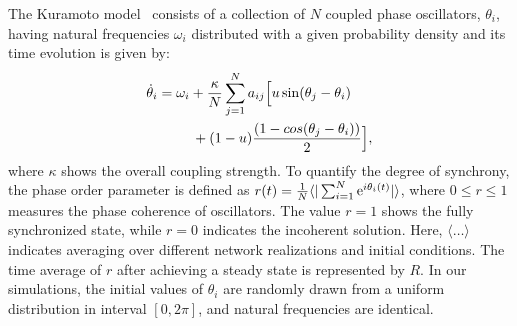 \documentclass[a0paper,portrait]{baposter}
\begin{document}
\begin{poster}


{
The Kuramoto model~\cite{kuramoto2003chemical} consists of a collection of $N$ coupled phase oscillators, $\theta_i$, having natural frequencies $\omega_i$  distributed
with a given probability density and its time evolution is given by:
\begin{align*}
&\dot{\theta}_i=\omega_i+\frac{\kappa}{N} \sum_{j=1}^{N} a_{ij} \Big[ u\sin(\theta_j-\theta_i)\\
	&\hspace{1.15cm}+(1-u)\frac{(1-cos(\theta_j-\theta_i))}{2} \Big],
\end{align*}
where $\kappa$ shows the overall coupling strength. 
To quantify the degree of synchrony, the phase order parameter is defined as $r(t)= {1\over N} {\langle | \sum_{i=1}^{N} \mathrm{e}^{i\theta_{i}(t)}| \rangle}$,  where $0\leq r\leq{1}$ measures the phase coherence of oscillators. The value $r=1$ shows the fully synchronized state, while $r=0$ indicates the incoherent solution. Here, $\langle\dots\rangle$ indicates averaging over different network realizations and initial conditions. The time average of $r$ after achieving a steady state is represented  by $R$. In our simulations, the initial values of $\theta_i$ are randomly drawn from a uniform distribution in interval $[0, 2\pi]$, and natural frequencies are identical.
}


\end{poster}
\end{document}
